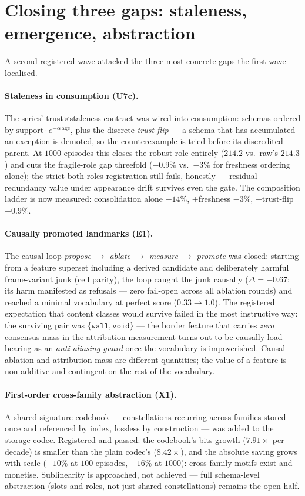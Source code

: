 \documentclass{article}
\begin{document}
\section{Closing three gaps: staleness, emergence, abstraction}
\label{p5:sec:gaps}

A second registered wave attacked the three most concrete gaps the
first wave localised.

\paragraph{Staleness in consumption (U7c).} The series'
trust$\times$staleness contract was wired into consumption: schemas
ordered by $\text{support}\cdot e^{-\alpha\,\text{age}}$, plus the
discrete \emph{trust-flip} --- a schema that has accumulated an
exception is demoted, so the counterexample is tried before its
discredited parent. At $1000$ episodes this closes the robust role
entirely ($214.2$ vs.\ raw's $214.3$) and cuts the fragile-role gap
threefold ($-0.9\%$ vs.\ $-3\%$ for freshness ordering alone); the
strict both-roles registration still fails, honestly --- residual
redundancy value under appearance drift survives even the gate. The
composition ladder is now measured: consolidation alone $-14\%$,
$+$freshness $-3\%$, $+$trust-flip $-0.9\%$.

\paragraph{Causally promoted landmarks (E1).} The causal loop
\emph{propose $\to$ ablate $\to$ measure $\to$ promote} was closed:
starting from a feature superset including a derived candidate and
deliberately harmful frame-variant junk (cell parity), the loop
caught the junk causally ($\Delta = -0.67$; its harm manifested as
refusals --- zero fail-open across all ablation rounds) and reached a
minimal vocabulary at perfect score ($0.33 \to 1.0$). The registered
expectation that content classes would survive failed in the most
instructive way: the surviving pair was $\{\texttt{wall},
\texttt{void}\}$ --- the border feature that carries \emph{zero}
consensus mass in the attribution measurement turns out to be
causally load-bearing as an \emph{anti-aliasing guard} once the
vocabulary is impoverished. Causal ablation and attribution mass are
different quantities; the value of a feature is non-additive and
contingent on the rest of the vocabulary.

\paragraph{First-order cross-family abstraction (X1).} A shared
signature codebook --- constellations recurring across families
stored once and referenced by index, lossless by construction ---
was added to the storage codec. Registered and passed: the codebook's
bits growth ($7.91\times$ per decade) is smaller than the plain
codec's ($8.42\times$), and the absolute saving grows with scale
($-10\%$ at $100$ episodes, $-16\%$ at $1000$): cross-family motifs
exist and monetise. Sublinearity is approached, not achieved ---
full schema-level abstraction (slots and roles, not just shared
constellations) remains the open half.
\end{document}
